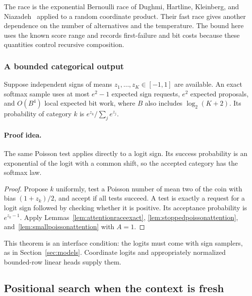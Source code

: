 The race is the exponential Bernoulli race of
Dughmi, Hartline, Kleinberg, and Niazadeh~\cite{dughmi2017} applied to a
random coordinate product.  Their fast race gives another dependence on
the number of alternatives and the temperature.  The bound here uses the
known score range and records first-failure and bit costs because these
quantities control recursive composition.

\subsubsection{A bounded categorical output}\label{sec:boundedoutputprimitive}

\begin{theorem}\label{thm:boundedsoftmaxinterface}
Suppose independent signs of means $z_1,\ldots,z_K\in[-1,1]$ are available.
An exact softmax sample uses at most $e^2-1$ expected sign requests,
$e^2$ expected proposals, and $O(B^4)$ local expected bit work, where $B$
also includes $\log_2(K+2)$.  Its probability of category $k$ is
$e^{z_k}/\sum_j e^{z_j}$.
\end{theorem}
\paragraph{Proof idea.}
The same Poisson test applies directly to a logit sign.  Its success probability is an exponential of the logit with a common shift, so the accepted category has the softmax law.

\begin{proof}
Propose $k$ uniformly, test a Poisson number of mean two of the coin with
bias $(1+z_k)/2$, and accept if all tests succeed.  A test is exactly a
request for a logit sign followed by checking whether it is positive.
Its acceptance probability is $e^{z_k-1}$.  Apply
Lemmas~\ref{lem:attentionraceexact}, \ref{lem:stoppedpoissonattention},
and~\ref{lem:smallpoissonattention} with $A=1$.
\end{proof}

This theorem is an interface condition: the logits must come with sign
samplers, as in Section~\ref{sec:models}.  Coordinate logits and
appropriately normalized bounded-row linear heads supply them.

\subsection{Positional search when the context is fresh}\label{sec:attentionsearchlower}

